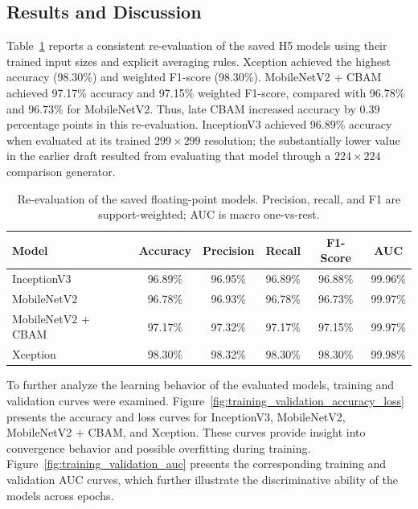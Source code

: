 \subsection{Results and Discussion}

Table~\ref{tab:model_comparison} reports a consistent re-evaluation of the saved H5 models using their trained input sizes and explicit averaging rules. Xception achieved the highest accuracy (98.30\%) and weighted F1-score (98.30\%). MobileNetV2 + CBAM achieved 97.17\% accuracy and 97.15\% weighted F1-score, compared with 96.78\% and 96.73\% for MobileNetV2. Thus, late CBAM increased accuracy by 0.39 percentage points in this re-evaluation. InceptionV3 achieved 96.89\% accuracy when evaluated at its trained $299\times299$ resolution; the substantially lower value in the earlier draft resulted from evaluating that model through a $224\times224$ comparison generator.

\begin{table}[H]
\caption{Re-evaluation of the saved floating-point models. Precision, recall, and F1 are support-weighted; AUC is macro one-vs-rest.}
\label{tab:model_comparison}
\centering
\small
\begin{tabularx}{\textwidth}{l c c c c c}
\toprule
\textbf{Model} & \textbf{Accuracy} & \textbf{Precision} & \textbf{Recall} & \textbf{F1-Score} & \textbf{AUC} \\
\midrule
InceptionV3~\cite{szegedy2016rethinking} & 96.89\% & 96.95\% & 96.89\% & 96.88\% & 99.96\% \\
MobileNetV2~\cite{sandler2018mobilenetv2} & 96.78\% & 96.93\% & 96.78\% & 96.73\% & 99.97\% \\
MobileNetV2 + CBAM~\cite{sandler2018mobilenetv2,woo2018cbam} & 97.17\% & 97.32\% & 97.17\% & 97.15\% & 99.97\% \\
Xception~\cite{chollet2017xception} & 98.30\% & 98.32\% & 98.30\% & 98.30\% & 99.98\% \\
\bottomrule
\end{tabularx}
\normalsize
\end{table}

To further analyze the learning behavior of the evaluated models, training and validation curves were examined. Figure~\ref{fig:training_validation_accuracy_loss} presents the accuracy and loss curves for InceptionV3, MobileNetV2, MobileNetV2 + CBAM, and Xception. These curves provide insight into convergence behavior and possible overfitting during training. Figure~\ref{fig:training_validation_auc} presents the corresponding training and validation AUC curves, which further illustrate the discriminative ability of the models across epochs.

